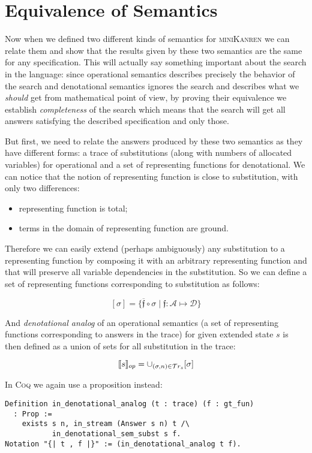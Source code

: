 \section{Equivalence of Semantics}
\label{equivalence}

Now when we defined two different kinds of semantics for \textsc{miniKanren} we can relate them and show that the results given by these two semantics are the same for any specification.
This will actually say something important about the search in the language: since operational semantics describes precisely the behavior of the search and denotational semantics
ignores the search and describes what we \emph{should} get from mathematical point of view, by proving their equivalence we establish \emph{completeness} of the search which
means that the search will get all answers satisfying the described specification and only those.

But first, we need to relate the answers produced by these two semantics as they have different forms: a trace of substitutions (along with numbers of allocated variables)
for operational and a set of representing functions for denotational. We can notice that the notion of representing function is close to substitution, with only two differences:

\begin{itemize}
\item representing function is total;
\item terms in the domain of representing function are ground.
\end{itemize}

Therefore we can easily extend (perhaps ambiguously) any substitution to a representing function by composing it with an arbitrary representing function and that will
preserve all variable dependencies in the substitution. So we can define a set of representing functions corresponding to substitution as follows:

\[
[\sigma] = \{\overline{\mathfrak f} \circ \sigma \mid \mathfrak{f}:\mathcal{A}\mapsto\mathcal{D}\}
\]

And \emph{denotational analog} of an operational semantics (a set of representing functions corresponding to answers in the trace) for given extended state $s$ is
then defined as a union of sets for all substitution in the trace:

\[
\llbracket{s}\rrbracket_{op} = \cup_{(\sigma, n) \in \mathcal{T}r_{s}} [\sigma]
\]

{ \color{blue}  In \textsc{Coq} we again use a proposition instead:

\begin{lstlisting}[language=Coq,basicstyle=\footnotesize]
Definition in_denotational_analog (t : trace) (f : gt_fun)
  : Prop :=
    exists s n, in_stream (Answer s n) t /\
           in_denotational_sem_subst s f.
Notation "{| t , f |}" := (in_denotational_analog t f).
\end{lstlisting}
}

